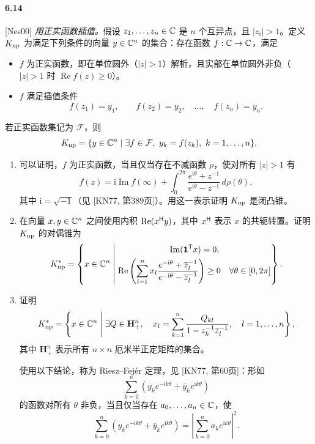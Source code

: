 \paragraph{6.14} [Nes00] \emph{用正实函数插值。}假设 $z_1,\ldots,z_n\in\mathbb C$ 是 $n$ 个互异点，且 $|z_i|>1$。定义 $K_{\rm np}$ 为满足下列条件的向量 $y\in\mathbb C^n$ 的集合：存在函数 $f:\mathbb C\to\mathbb C$，满足
\begin{itemize}
\item $f$ 为正实函数，即在单位圆外（$|z|>1$）解析，且实部在单位圆外非负（$|z|>1$ 时 $\operatorname{Re}f(z)\ge0$）。
\item $f$ 满足插值条件
\[f(z_1)=y_1,\qquad f(z_2)=y_2,\quad\ldots,\quad f(z_n)=y_n.\]
\end{itemize}
若正实函数集记为 $\mathcal F$，则
\[K_{\rm np}=\{y\in\mathbb C^n\mid\exists f\in\mathcal F,\ y_k=f(z_k),\ k=1,\ldots,n\}.\]
\begin{enumerate}[label=(\alph*)]
\item 可以证明，$f$ 为正实函数，当且仅当存在不减函数 $\rho$，使对所有 $|z|>1$ 有
\[f(z)=\mathrm i\operatorname{Im}f(\infty)+\int_0^{2\pi}\frac{e^{\mathrm i\theta}+z^{-1}}{e^{\mathrm i\theta}-z^{-1}}\,d\rho(\theta),\]
其中 $\mathrm i=\sqrt{-1}$（见 [KN77, 第389页]）。用这一表示证明 $K_{\rm np}$ 是闭凸锥。
\item 在向量 $x,y\in\mathbb C^n$ 之间使用内积 $\operatorname{Re}(x^{\mathsf H}y)$，其中 $x^{\mathsf H}$ 表示 $x$ 的共轭转置。证明 $K_{\rm np}$ 的对偶锥为
\[K_{\rm np}^*=\left\{x\in\mathbb C^n\;\middle|\;\begin{gathered}
\operatorname{Im}(\mathbf 1^\mathsf T x)=0,\\
\operatorname{Re}\left(\sum_{l=1}^n x_l\frac{e^{-\mathrm i\theta}+\overline z_l^{-1}}{e^{-\mathrm i\theta}-\overline z_l^{-1}}\right)\ge0\quad\forall\theta\in[0,2\pi]
\end{gathered}\right\}.\]
\item 证明
\[K_{\rm np}^*=\left\{x\in\mathbb C^n\;\middle|\;\exists Q\in\mathbf H_+^n,\quad x_l=\sum_{k=1}^n\frac{Q_{kl}}{1-z_k^{-1}\overline z_l^{-1}},\quad l=1,\ldots,n\right\},\]
其中 $\mathbf H_+^n$ 表示所有 $n\times n$ 厄米半正定矩阵的集合。

使用以下结论，称为 Riesz--Fej\'er 定理，见 [KN77, 第60页]：形如
\[\sum_{k=0}^n(y_ke^{-\mathrm ik\theta}+\overline y_ke^{\mathrm ik\theta})\]
的函数对所有 $\theta$ 非负，当且仅当存在 $a_0,\ldots,a_n\in\mathbb C$，使
\[\sum_{k=0}^n(y_ke^{-\mathrm ik\theta}+\overline y_ke^{\mathrm ik\theta})=\left|\sum_{k=0}^n a_ke^{\mathrm ik\theta}\right|^2.\]
\end{enumerate}

